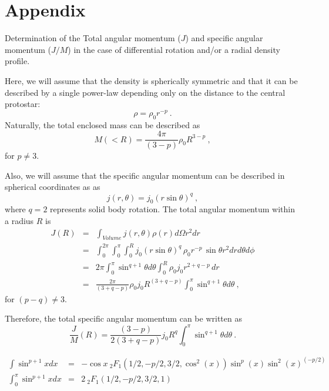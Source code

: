 \section{Appendix}
Determination of the Total angular momentum ($J$) and specific angular momentum ($J/M$) in the case of differential rotation and/or a radial density profile.

Here, we will assume that the density is spherically symmetric and that it can be described 
by a single power-law depending only on the distance to the central protostar:
\begin{equation}%
\rho = \rho_0 r^{-p}~.
\end{equation}
Naturally, the total enclosed mass can be described as 
\begin{equation}
M(<R) = \frac{4\pi}{(3-p)} \rho_0 R^{3-p}~,
\end{equation}
for $p\ne 3$.

Also, we will assume that the specific angular momentum can be described in spherical coordinates as as
\begin{equation}
j(r,\theta) = j_0 ( r \sin \theta)^q~,
\end{equation}
where $q=2$ represents solid body rotation.
%
The total angular momentum within a radius $R$ is
\begin{eqnarray}
J(R) &=& \int_{Volume} j(r,\theta) \rho(r) d\Omega r^2 dr \\
&=& \int_0^{2\pi}\int_{0}^{\pi}\int_0^R j_0 ( r \sin \theta)^q\, \rho_0 r^{-p}\, \sin\theta r^2 dr d\theta d\phi\\
&=& 2\pi \int_{0}^{\pi} \sin^{q+1} \theta d\theta \int_0^R \rho_0 j_0 r^{2+q-p} \,dr \nonumber \\
&=& \frac{2\pi}{(3+q-p)}\rho_0 j_0 R^{(3+q-p)} \int_{0}^{\pi} \sin^{q+1} \theta d\theta~,
\end{eqnarray}
for $(p-q)\ne 3$.

Therefore, the total specific angular momentum can be written as
\begin{equation}
\frac{J}{M}(R) = \frac{(3-p)}{2(3+q-p)} j_0 R^{q} 
\int_{0}^{\pi} \sin^{q+1} \theta d\theta~.
\end{equation}


\begin{eqnarray}
\int \sin^{p+1} x dx &=& -\cos{x} ~_2F_1(1/2, -p/2, 3/2, \cos^2(x)) \sin^p(x) \sin^2(x)^{(-p/2)}\\
\int_{0}^{\pi} \sin^{p+1} x dx &=&  2 ~_2F_1(1/2, -p/2, 3/2, 1)
\end{eqnarray}
  
  
  
  
  